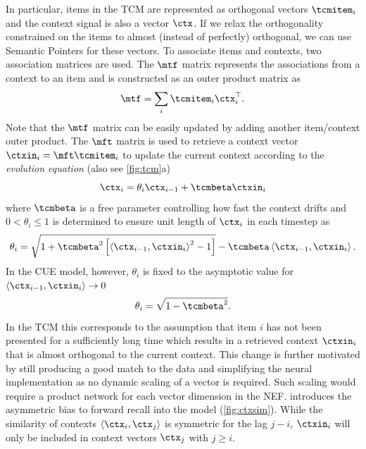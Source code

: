 In particular, items in the TCM are represented as orthogonal vectors $\tcmitem_i$ and the context signal is also a vector $\ctx$.
If we relax the orthogonality constrained on the items to almost (instead of perfectly) orthogonal, we can use Semantic Pointers for these vectors.
To associate items and contexts, two association matrices are used.
The $\mtf$ matrix represents the associations from a context to an item and is constructed as an outer product matrix as
\begin{equation}
    \mtf = \sum_i \tcmitem_i \ctx_i\Tr \text{.}
\end{equation}
Note that the $\mtf$ matrix can be easily updated by adding another item/context outer product.
The $\mft$ matrix is used to retrieve a context vector $\ctxin_i = \mft \tcmitem_i$ to update the current context according to the \emph{evolution equation} (also see \cref{fig:tcm}a)
\begin{equation}
    \ctx_i = \theta_i \ctx_{i-1} + \tcmbeta \ctxin_i\label{eqn:ctx-update}
\end{equation}
where $\tcmbeta$ is a free parameter controlling how fast the context drifts and $0 < \theta_i \leq 1$ is determined to ensure unit length of $\ctx_i$ in each timestep as
\begin{equation}
    \theta_i = \sqrt{1 + \tcmbeta^2 \sbr{\left\langle\ctx_{i-1}, \ctxin_i\right\rangle^2 - 1}} - \tcmbeta \left\langle\ctx_{i-1}, \ctxin_i\right\rangle\text{.}
\end{equation}
In the CUE model, however, $\theta_i$ is fixed to the asymptotic value for $\langle\ctx_{i-1}, \ctxin_i\rangle \rightarrow 0$
\begin{equation}
    \theta_i = \sqrt{1 - \tcmbeta^2}\text{.}
\end{equation}
In the TCM this corresponds to the assumption that item $i$ has not been presented for a sufficiently long time which results in a retrieved context $\ctxin_i$ that is almost orthogonal to the current context.
This change is further motivated by still producing a good match to the data and simplifying the neural implementation as no dynamic scaling of a vector is required.
Such scaling would require a product network for each vector dimension in the NEF\@.
 introduces the asymmetric bias to forward recall into the model (\cref{fig:ctxsim}).
While the similarity of contexts $\langle\ctx_i, \ctx_j\rangle$ is symmetric for the lag $j - i$, $\ctxin_i$ will only be included in context vectors $\ctx_j$ with $j \geq i$.
